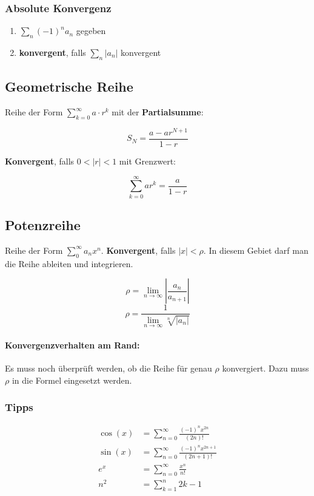\documentclass[11pt]{article}
\begin{document}
\subsubsection*{Absolute Konvergenz}

\begin{enumerate}
	\item $\sum_n (-1)^n a_n$ gegeben
	\item \textbf{konvergent}, falls $\sum_n |a_n|$ konvergent
\end{enumerate}

\subsection{Geometrische Reihe}

Reihe der Form $\sum^\infty_{k = 0} a \cdot r^k$ mit der \textbf{Partialsumme}:

\begin{equation*}
	S_N=\frac{a-ar^{N+1}}{1-r}
\end{equation*}

\textbf{Konvergent}, falls $0<|r|<1$ mit Grenzwert:

\begin{equation*}
	\sum^\infty_{k=0}ar^k=\frac{a}{1-r}
\end{equation*}

\subsection{Potenzreihe}

Reihe der Form $\sum^\infty_0 a_nx^n$. \textbf{Konvergent}, falls $|x|<\rho$. In diesem Gebiet darf man die Reihe ableiten und integrieren.

\begin{equation*}
	\rho= \lim_{n\rightarrow \infty}|\frac{a_n}{a_{n+1}}|
\end{equation*}
\begin{equation*}
	\rho=\frac{1}{\lim_{n\rightarrow \infty}\sqrt[n]{|a_n|}}
\end{equation*}

\paragraph{Konvergenzverhalten am Rand:} Es muss noch überprüft werden, ob die Reihe für genau $\rho$ konvergiert. Dazu muss $\rho$ in die Formel eingesetzt werden.

\subsubsection{Tipps}
\begin{equation*}
\begin{split}
	\cos(x) & = \sum^\infty_{n =0}\frac{(-1)^nx^{2n}}{(2n)!} \\
	\sin(x) & = \sum^\infty_{n =0}\frac{(-1)^nx^{2n+1}}{(2n+1)!} \\
	e^x & = \sum^\infty_{n =0}\frac{x^n}{n!} \\
	n^2 & = \sum_{k=1}^n 2k-1
\end{split}
\end{equation*}
\end{document}
